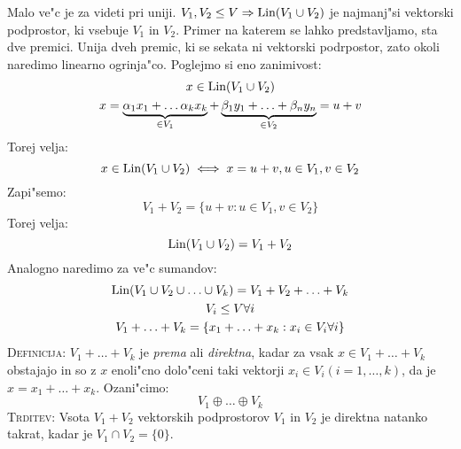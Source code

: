 Malo ve"c je za videti pri uniji. $V_1, V_2 \leq V \Rightarrow \text{Lin} (V_1 \cup V_2)$ je najmanj"si vektorski podprostor, ki vsebuje $V_1$ in $V_2$. Primer na katerem se lahko predstavljamo, sta dve premici. Unija dveh premic, ki se sekata ni vektorski podrpostor, zato okoli naredimo linearno ogrinja"co. Poglejmo si eno zanimivost:
\begin{gather*}
x \in \text{Lin} (V_1 \cup V_2) \\
x = \underbrace{\alpha_1 x_1 + \ldots \alpha_k x_k}_{\in V_1} + \underbrace{\beta_1 y_1 + \ldots + \beta_n y_n}_{\in V_2} = u + v
\end{gather*}
Torej velja:
\begin{equation*}
x \in \text{Lin} (V_1 \cup V_2) \iff x = u + v, u \in V_1, v \in V_2
\end{equation*}
Zapi"semo:
\begin{equation*}
V_1 + V_2 = \{u + v: u \in V_1, v \in V_2\}
\end{equation*}
Torej velja:
\begin{equation*}
\text{Lin} (V_1 \cup V_2) = V_1 + V_2
\end{equation*}
Analogno naredimo za ve"c sumandov:
\begin{gather*}
	\text{Lin} (V_1 \cup V_2 \cup \ldots \cup V_k) = V_1 + V_2 + \ldots + V_k \\
	V_i \leq V \forall i \\
	V_1 + \ldots + V_k = \{x_1 + \ldots + x_k: x_i \in V_i \forall i\}
\end{gather*}
\textsc{Definicija:} $V_1 + \ldots + V_k$ je \emph{prema} ali \emph{direktna}, kadar za vsak $x \in V_1 + \ldots + V_k$ obstajajo in so z $x$ enoli"cno dolo"ceni taki vektorji $x_i \in V_i (i = 1, \ldots, k)$, da je $x = x_1 + \ldots + x_k$. Ozani"cimo:
\begin{equation*}
V_1 \oplus \ldots \oplus V_k
\end{equation*}
\textsc{Trditev:} Vsota $V_1 + V_2$ vektorskih podprostorov $V_1$ in $V_2$ je direktna natanko takrat, kadar je $V_1 \cap V_2 = \{0\}$.

